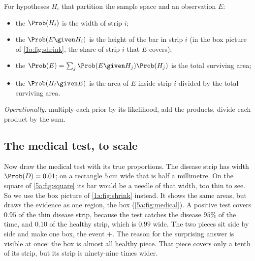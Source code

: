 \begin{workdef}
For hypotheses $H_i$ that partition the sample space and an observation $E$:
\begin{itemize}[itemsep=1pt,leftmargin=1.2em]
  \item the  $\Prob(H_i)$  is the width of strip $i$;
  \item the  $\Prob(E\given H_i)$  is the
        height of the bar in strip $i$ (in the box picture of \cref{1a:fig:shrink},
        the share of strip $i$ that $E$ covers);
  \item the  $\Prob(E)=\sum_j\Prob(E\given H_j)\Prob(H_j)$
         is the total surviving
        area;
  \item the  $\Prob(H_i\given E)$  is the area of $E$ inside strip $i$ divided by the total
        surviving area.
\end{itemize}
\emph{Operationally:} multiply each prior by its likelihood, add the products,
divide each product by the sum.
\end{workdef}

\subsection{The medical test, to scale}

Now draw the medical test with its true proportions. The disease strip has width
$\Prob(D)=0.01$; on a rectangle $5\,$cm wide that is half a millimetre. On the
square of \cref{5a:fig:square} its bar would be a needle of that width, too thin
to see. So we use the box picture of \cref{1a:fig:shrink} instead. It shows the
same areas, but draws the evidence as one region, the box
(\cref{5a:fig:medical}). A positive test covers
$0.95$ of the thin disease strip, because the test catches the disease $95\%$ of
the time, and $0.10$ of the healthy strip, which is $0.99$ wide. The two pieces
sit side by side and make one box, the event $+$. The reason for the surprising
answer is visible at once: the box is almost all healthy piece. That piece covers
only a tenth of its strip, but its strip is ninety-nine times wider.

